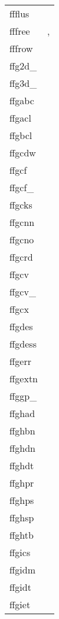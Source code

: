 \documentclass[11pt]{book}
\begin{document}
\begin{tabular}{lr}
ffflus     & \pageref{ffflus} \\
fffree     & \pageref{ffgkls},  \pageref{ffhdr2str} \\
fffrow    & \pageref{fffrow} \\
ffg2d\_      & \pageref{ffg2dx} \\
ffg3d\_      & \pageref{ffg3dx} \\
ffgabc      & \pageref{ffgabc} \\
ffgacl  & \pageref{ffgacl} \\
ffgbcl  & \pageref{ffgbcl} \\
ffgcdw  & \pageref{ffgcdw} \\
ffgcf    & \pageref{ffgcf} \\
ffgcf\_    & \pageref{ffgcfx} \\
ffgcks     & \pageref{ffgcks} \\
ffgcnn    & \pageref{ffgcnn} \\
ffgcno     & \pageref{ffgcno} \\
ffgcrd         & \pageref{ffgcrd} \\
ffgcv        & \pageref{ffgcv} \\
ffgcv\_    & \pageref{ffgcvx} \\
ffgcx     & \pageref{ffgcx} \\
ffgdes & \pageref{ffgdes} \\
ffgdess & \pageref{ffgdes} \\
ffgerr  & \pageref{ffgerr} \\
ffgextn        & \pageref{ffgextn} \\
ffggp\_  & \pageref{ffggpx} \\
ffghad    & \pageref{ffghad} \\
ffghbn      & \pageref{ffghbn} \\
ffghdn    & \pageref{ffghdn} \\
ffghdt   & \pageref{ffghdt} \\
ffghpr       & \pageref{ffghpr} \\
ffghps        & \pageref{ffghps} \\
ffghsp      & \pageref{ffghsp} \\
ffghtb      & \pageref{ffghtb} \\
ffgics & \pageref{ffgics} \\
ffgidm & \pageref{ffgidm} \\
ffgidt & \pageref{ffgidt} \\
ffgiet & \pageref{ffgidt} \\

\end{tabular}
\end{document}
